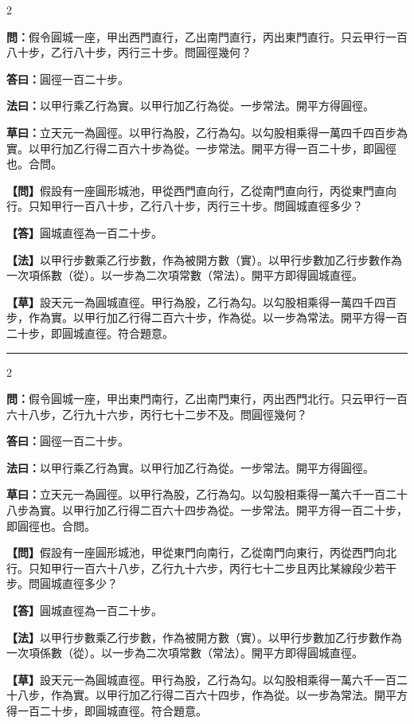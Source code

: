 \documentclass[11pt,a4paper]{article}
\newcommand{\longline}{\noindent\rule{\textwidth}{0.4pt}}
\newcommand{\wenC}[1]{\par\noindent\textbf{\textcolor{probcolor}{問：}}{#1}\par}
\newcommand{\daC}[1]{\par\noindent\textbf{\textcolor{anscolor}{答曰：}}{#1}\par}
\newcommand{\fayueC}[1]{\par\noindent\textbf{\textcolor{methodcolor}{法曰：}}{#1}\par}
\newcommand{\caoyueC}[1]{\par\noindent\textbf{草曰：}{#1}\par}
\newcommand{\wenM}[1]{\par\noindent\textbf{\textcolor{probcolor}{【問】}}{#1}\par}
\newcommand{\daM}[1]{\par\noindent\textbf{\textcolor{anscolor}{【答】}}{#1}\par}
\newcommand{\fayueM}[1]{\par\noindent\textbf{\textcolor{methodcolor}{【法】}}{#1}\par}
\newcommand{\caoyueM}[1]{\par\noindent\textbf{【草】}{#1}\par}
\begin{document}
\begin{paracol}{2}

\wenC{假令圓城一座，甲出西門直行，乙出南門直行，丙出東門直行。只云甲行一百八十步，乙行八十步，丙行三十步。問圓徑幾何？}

\daC{圓徑一百二十步。}

\fayueC{以甲行乘乙行為實。以甲行加乙行為從。一步常法。開平方得圓徑。}

\caoyueC{立天元一為圓徑。以甲行為股，乙行為勾。以勾股相乘得一萬四千四百步為實。以甲行加乙行得二百六十步為從。一步常法。開平方得一百二十步，即圓徑也。合問。}

\switchcolumn

\wenM{假設有一座圓形城池，甲從西門直向行，乙從南門直向行，丙從東門直向行。只知甲行一百八十步，乙行八十步，丙行三十步。問圓城直徑多少？}

\daM{圓城直徑為一百二十步。}

\fayueM{以甲行步數乘乙行步數，作為被開方數（實）。以甲行步數加乙行步數作為一次項係數（從）。以一步為二次項常數（常法）。開平方即得圓城直徑。}

\caoyueM{設天元一為圓城直徑。甲行為股，乙行為勾。以勾股相乘得一萬四千四百步，作為實。以甲行加乙行得二百六十步，作為從。以一步為常法。開平方得一百二十步，即圓城直徑。符合題意。}

\end{paracol}

\vspace{0.3cm}
\longline

\begin{paracol}{2}

\wenC{假令圓城一座，甲出東門南行，乙出南門東行，丙出西門北行。只云甲行一百六十八步，乙行九十六步，丙行七十二步不及。問圓徑幾何？}

\daC{圓徑一百二十步。}

\fayueC{以甲行乘乙行為實。以甲行加乙行為從。一步常法。開平方得圓徑。}

\caoyueC{立天元一為圓徑。以甲行為股，乙行為勾。以勾股相乘得一萬六千一百二十八步為實。以甲行加乙行得二百六十四步為從。一步常法。開平方得一百二十步，即圓徑也。合問。}

\switchcolumn

\wenM{假設有一座圓形城池，甲從東門向南行，乙從南門向東行，丙從西門向北行。只知甲行一百六十八步，乙行九十六步，丙行七十二步且丙比某線段少若干步。問圓城直徑多少？}

\daM{圓城直徑為一百二十步。}

\fayueM{以甲行步數乘乙行步數，作為被開方數（實）。以甲行步數加乙行步數作為一次項係數（從）。以一步為二次項常數（常法）。開平方即得圓城直徑。}

\caoyueM{設天元一為圓城直徑。甲行為股，乙行為勾。以勾股相乘得一萬六千一百二十八步，作為實。以甲行加乙行得二百六十四步，作為從。以一步為常法。開平方得一百二十步，即圓城直徑。符合題意。}

\end{paracol}
\end{document}
